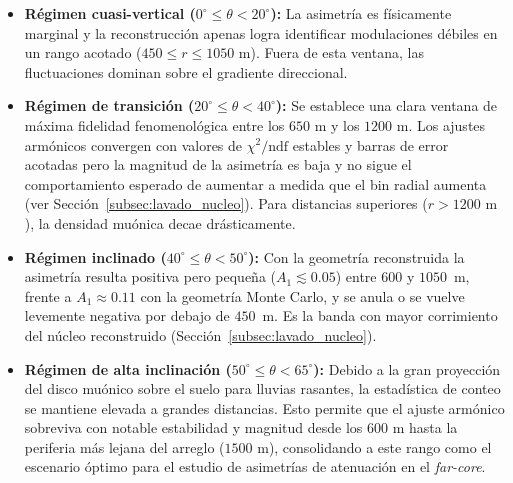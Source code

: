 \begin{itemize}
	\item \textbf{Régimen cuasi-vertical ($0^\circ \le \theta < 20^\circ$):} La asimetría es físicamente marginal y la reconstrucción apenas logra identificar modulaciones débiles en un rango acotado ($450 \le r \le 1050\text{ m}$). Fuera de esta ventana, las fluctuaciones dominan sobre el gradiente direccional.
	
	\item \textbf{Régimen de transición ($20^\circ \le \theta < 40^\circ$):} Se establece una clara ventana de máxima fidelidad fenomenológica entre los $650\text{ m}$ y los $1200\text{ m}$. Los ajustes armónicos convergen con valores de $\chi^2/\mathrm{ndf}$ estables y barras de error acotadas pero la magnitud de la asimetría es baja y no sigue el comportamiento esperado de aumentar a medida que el bin radial aumenta {\color{blue}(ver Sección~\ref{subsec:lavado_nucleo})}. Para distancias superiores ($r > 1200\text{ m}$), la densidad muónica decae drásticamente.

	\item \textbf{Régimen inclinado ($40^\circ \le \theta < 50^\circ$):} {\color{blue}Con la geometría reconstruida la asimetría resulta positiva pero pequeña ($A_1 \lesssim 0.05$) entre $600$ y $1050$~m, frente a $A_1 \approx 0.11$ con la geometría Monte Carlo, y se anula o se vuelve levemente negativa por debajo de $450$~m. Es la banda con mayor corrimiento del núcleo reconstruido (Sección~\ref{subsec:lavado_nucleo}).}

	\item \textbf{Régimen de alta inclinación ($50^\circ \le \theta < 65^\circ$):} Debido a la gran proyección del disco muónico sobre el suelo para lluvias rasantes, la estadística de conteo se mantiene elevada a grandes distancias. Esto permite que el ajuste armónico sobreviva con notable estabilidad y magnitud desde los $600\text{ m}$ hasta la periferia más lejana del arreglo ($1500\text{ m}$), consolidando a este rango como el escenario óptimo para el estudio de asimetrías de atenuación en el \textit{far-core}.
\end{itemize}

